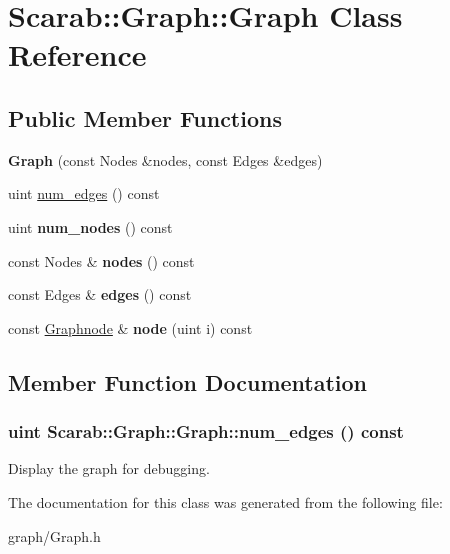 \hypertarget{class_scarab_1_1_graph_1_1_graph}{
\section{Scarab::Graph::Graph Class Reference}
\label{class_scarab_1_1_graph_1_1_graph}
}
\subsection*{Public Member Functions}
\begin{DoxyCompactItemize}
\item 
\hypertarget{class_scarab_1_1_graph_1_1_graph_ac753f9750341458516e06fb1437a1258}{
{\bfseries Graph} (const Nodes \&nodes, const Edges \&edges)}
\label{class_scarab_1_1_graph_1_1_graph_ac753f9750341458516e06fb1437a1258}

\item 
uint \hyperlink{class_scarab_1_1_graph_1_1_graph_afdfbdd8e5427a646707ceb22ca15d2e2}{num\_\-edges} () const 
\item 
\hypertarget{class_scarab_1_1_graph_1_1_graph_ac35877b52ec1f625ff452a4073026b26}{
uint {\bfseries num\_\-nodes} () const }
\label{class_scarab_1_1_graph_1_1_graph_ac35877b52ec1f625ff452a4073026b26}

\item 
\hypertarget{class_scarab_1_1_graph_1_1_graph_a8d0c6189ef1569626348a30e908870e4}{
const Nodes \& {\bfseries nodes} () const }
\label{class_scarab_1_1_graph_1_1_graph_a8d0c6189ef1569626348a30e908870e4}

\item 
\hypertarget{class_scarab_1_1_graph_1_1_graph_a19a63be838e64b57e46cba029e273162}{
const Edges \& {\bfseries edges} () const }
\label{class_scarab_1_1_graph_1_1_graph_a19a63be838e64b57e46cba029e273162}

\item 
\hypertarget{class_scarab_1_1_graph_1_1_graph_af226b4907b00e178a8f7bd6e972e42d2}{
const \hyperlink{class_scarab_1_1_graph_1_1_graphnode}{Graphnode} \& {\bfseries node} (uint i) const }
\label{class_scarab_1_1_graph_1_1_graph_af226b4907b00e178a8f7bd6e972e42d2}

\end{DoxyCompactItemize}


\subsection{Member Function Documentation}
\hypertarget{class_scarab_1_1_graph_1_1_graph_afdfbdd8e5427a646707ceb22ca15d2e2}{
\subsubsection[{num\_\-edges}]{\setlength{\rightskip}{0pt plus 5cm}uint Scarab::Graph::Graph::num\_\-edges () const}}
\label{class_scarab_1_1_graph_1_1_graph_afdfbdd8e5427a646707ceb22ca15d2e2}
Display the graph for debugging. 

The documentation for this class was generated from the following file:\begin{DoxyCompactItemize}
\item 
graph/Graph.h\end{DoxyCompactItemize}
